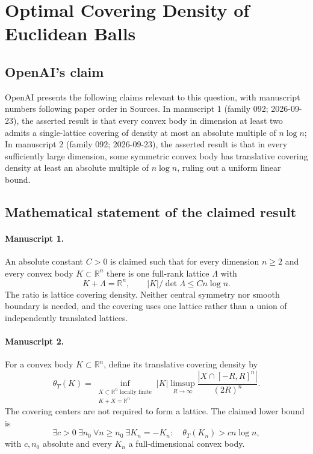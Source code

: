 \documentclass[11pt]{article}
\begin{document}
\section*{Optimal Covering Density of Euclidean Balls}

\subsection{OpenAI's claim}
OpenAI presents the following claims relevant to this question, with manuscript numbers following paper order in Sources. In manuscript 1 (family 092; 2026-09-23), the asserted result is that every convex body in dimension at least two admits a single-lattice covering of density at most an absolute multiple of $n\log n$; In manuscript 2 (family 092; 2026-09-23), the asserted result is that in every sufficiently large dimension, some symmetric convex body has translative covering density at least an absolute multiple of $n\log n$, ruling out a uniform linear bound.

\subsection{Mathematical statement of the claimed result}
\paragraph{Manuscript 1.}
An absolute constant $C>0$ is claimed such that for every dimension $n\ge2$ and every convex body $K\subset\mathbb R^n$ there is one full-rank lattice $\Lambda$ with
\[
 K+\Lambda=\mathbb R^n,\qquad |K|/\det\Lambda\le Cn\log n.
\]
The ratio is lattice covering density. Neither central symmetry nor smooth boundary is needed, and the covering uses one lattice rather than a union of independently translated lattices.

\paragraph{Manuscript 2.}
For a convex body $K\subset\mathbb R^n$, define its translative covering density by
\[
 \theta_T(K)=\inf_{\substack{X\subset\mathbb R^n\text{ locally finite}\\K+X=\mathbb R^n}}
 |K|\limsup_{R\to\infty}\frac{|X\cap[-R,R]^n|}{(2R)^n}.
\]
The covering centers are not required to form a lattice. The claimed lower bound is
\[
 \exists c>0\ \exists n_0\ \forall n\ge n_0\ \exists K_n=-K_n:
 \quad\theta_T(K_n)>c n\log n,
\]
with $c,n_0$ absolute and every $K_n$ a full-dimensional convex body.
\end{document}
